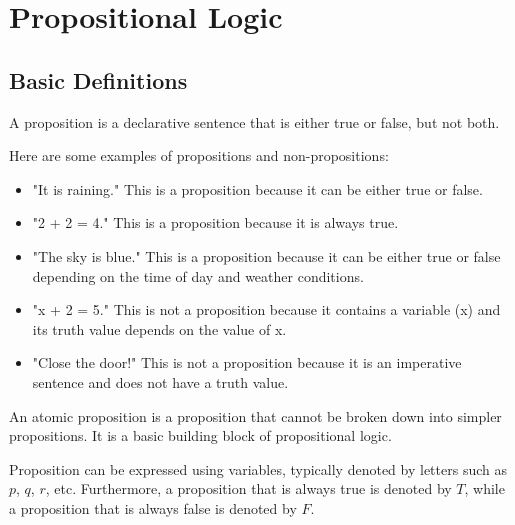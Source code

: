\chapter{Propositional Logic}

\section{Basic Definitions}
\begin{definition}[Proposition]
    A proposition is a declarative sentence that is either true or false, but not both.
\end{definition}

\begin{eg}
    Here are some examples of propositions and non-propositions:
    \begin{itemize}[itemsep=1pt,label=$\circ$]
        \item "It is raining." This is a proposition because it can be either true or false.
        \item "2 + 2 = 4." This is a proposition because it is always true.
        \item "The sky is blue." This is a proposition because it can be either true or false depending on the time of day and weather conditions.
        \item "x + 2 = 5." This is not a proposition because it contains a variable (x) and its truth value depends on the value of x.
        \item "Close the door!" This is not a proposition because it is an imperative sentence and does not have a truth value.
    \end{itemize}
\end{eg}

\begin{definition}
    An atomic proposition is a proposition that cannot be broken down into simpler propositions. It is a basic building block of propositional logic.
\end{definition}
Proposition can be expressed using variables, typically denoted by letters such as \(p\), \(q\), \(r\), etc. Furthermore, a proposition that is always true is denoted by $T$, while a proposition that is always false is denoted by $F$.

